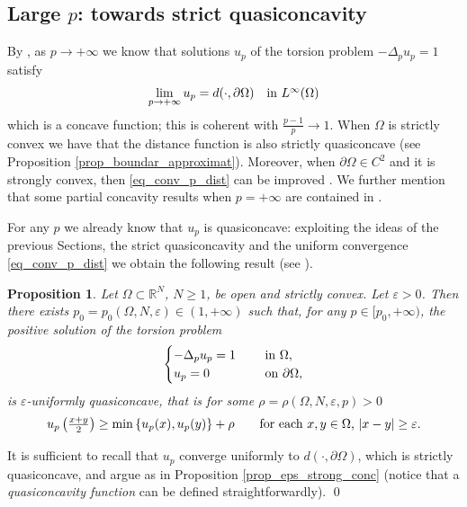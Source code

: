 \documentclass[11pt, reqno]{amsart}
\newtheorem{proposition}[lemma]{Proposition}
\theoremstyle{definition}
\numberwithin{equation}{section}
\newcommand{\R}{\mathbb{R}}
\def\eps{\varepsilon}
\renewenvironment{proof}[1][\proofname]{\medskip \noindent {\bfseries #1. }}{\qed \bigskip}
\begin{document}
\subsection{Large $p$: towards strict quasiconcavity}

By \cite[Theorem 1]{Kaw90}, as $p\to +\infty$ we know that solutions $u_p$ of the torsion problem $-\Delta_p u_p = 1$ satisfy 
\begin{equation}\label{eq_conv_p_dist}
\lim_{p \to +\infty} u_p = d(\cdot,\partial \Omega) \quad \hbox{in $L^{\infty}(\Omega)$}
\end{equation}
which is a concave function; this is coherent with $\frac{p-1}{p} \to 1$. When $\Omega$ is strictly convex we have that the distance function is also strictly quasiconcave (see Proposition \ref{prop_boundar_approximat}). 
Moreover, when $\partial \Omega \in C^2$ and it is strongly convex, then \eqref{eq_conv_p_dist} can be improved \cite[Theorem 2]{Kaw90}.
We further mention that some partial concavity results when $p=+\infty$ are contained in \cite[Section 4]{Juu10}. 


For any $p$ we already know that $u_p$ is quasiconcave: exploiting the ideas of the previous Sections, the strict quasiconcavity and the uniform convergence \eqref{eq_conv_p_dist}
we obtain the following result (see \cite[Definition 2.8]{GrRa22}).

\begin{proposition}
\label{prop_large_p}
Let $\Omega \subset \R^N$, $N\geq 1$, be open and strictly convex. Let $\eps>0$. 
Then there exists $p_0 =p_0(\Omega, N,\eps) \in (1,+\infty)$ such that, for any $p \in [p_0, +\infty)$, the positive solution of the torsion problem
$$\begin{cases}
-\Delta_p u_p = 1 & \quad \hbox{ in $\Omega$},\\ 
u_p =0 & \quad \hbox{ on $\partial \Omega$},
\end{cases}$$
is \emph{$\eps$-uniformly quasiconcave}, that is for some $\rho=\rho(\Omega, N,\eps, p)>0$ 
$$u_p \left(\tfrac{x+y}{2}\right)\geq \min \left\{u_p(x), u_p(y)\right\} + \rho \qquad \hbox{for each $x,y \in \Omega$, $|x-y|\geq \eps$}.$$
\end{proposition}

\begin{proof}
It is sufficient to recall that $u_p$ converge uniformly to $d(\cdot, \partial \Omega)$, which is strictly quasiconcave, and argue as in Proposition \ref{prop_eps_strong_conc} (notice that a \emph{quasiconcavity function} can be defined straightforwardly).
\end{proof}
\end{document}
